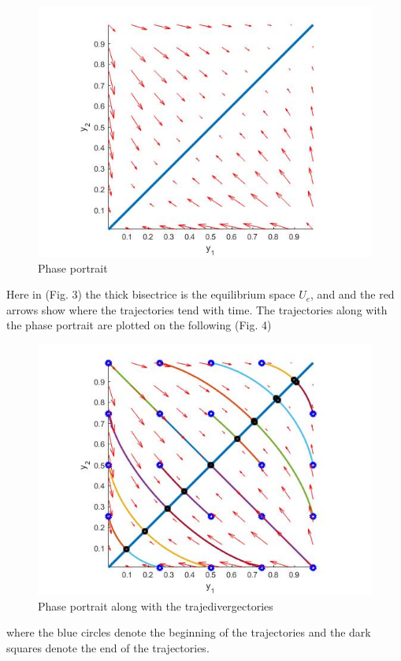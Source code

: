 \documentclass[a4paper,10pt, english]{article}
\begin{document}
\begin{figure}[ht]
\label{fig_c3}
\centering
\includegraphics[scale= 0.4]{3.jpg}
\caption{Phase portrait}
\end{figure}
Here in  (Fig. 3) the thick bisectrice is the equilibrium space $U_e$, and and the red arrows show where the trajectories tend with time.
The trajectories along with the phase portrait are plotted on the following (Fig. 4)
\begin{figure}[ht]
\label{fig_c4}
\centering
\includegraphics[scale= 0.4]{4.jpg}
\caption{Phase portrait along with the trajedivergectories}
\end{figure}
where the blue circles denote the beginning of the trajectories and the dark squares denote the end of the trajectories.
\end{document}
